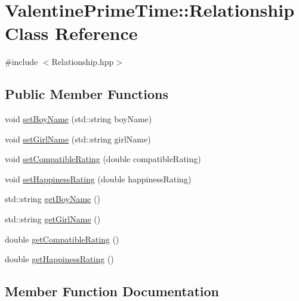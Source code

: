\hypertarget{classValentinePrimeTime_1_1Relationship}{}\section{Valentine\+Prime\+Time\+:\+:Relationship Class Reference}
\label{classValentinePrimeTime_1_1Relationship}


{\ttfamily \#include $<$Relationship.\+hpp$>$}

\subsection*{Public Member Functions}
\begin{DoxyCompactItemize}
\item 
void \hyperlink{classValentinePrimeTime_1_1Relationship_a27836be55c9edf8b0fb097f1106f31a0}{set\+Boy\+Name} (std\+::string boy\+Name)
\item 
void \hyperlink{classValentinePrimeTime_1_1Relationship_aa2fa3001e75ac6aeebbc847c97f13ed1}{set\+Girl\+Name} (std\+::string girl\+Name)
\item 
void \hyperlink{classValentinePrimeTime_1_1Relationship_a6fc110f901924a2d1bb9bce7304253f3}{set\+Compatible\+Rating} (double compatible\+Rating)
\item 
void \hyperlink{classValentinePrimeTime_1_1Relationship_a59c865a06917d61c874c15cf2d25f92c}{set\+Happiness\+Rating} (double happiness\+Rating)
\item 
std\+::string \hyperlink{classValentinePrimeTime_1_1Relationship_af83f34dc5735722b269ec24c6990e982}{get\+Boy\+Name} ()
\item 
std\+::string \hyperlink{classValentinePrimeTime_1_1Relationship_abecbe804cb4feb294759eb9b16612664}{get\+Girl\+Name} ()
\item 
double \hyperlink{classValentinePrimeTime_1_1Relationship_aaefdd96c321445918ba1cb266668ab4b}{get\+Compatible\+Rating} ()
\item 
double \hyperlink{classValentinePrimeTime_1_1Relationship_aee37cbab4306ac699715d34ff0a8f34b}{get\+Happiness\+Rating} ()
\end{DoxyCompactItemize}


\subsection{Member Function Documentation}
